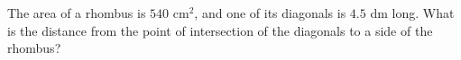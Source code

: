 The area of a rhombus is $540\text{ cm}^2$, and one of its diagonals is $4.5$ dm long. What is the distance from the point of intersection of the diagonals to a side of the rhombus?
